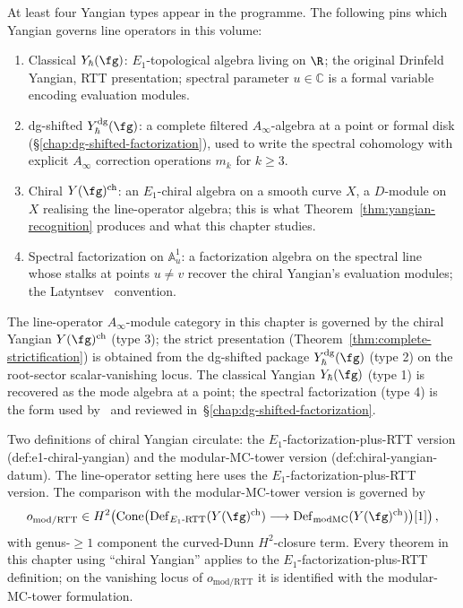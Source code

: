 \begin{convention}
\label{conv:line-operators-yangian-types}
At least four Yangian types appear in the programme. The following
pins which Yangian governs line operators in this volume:
\begin{enumerate}[label=\textup{(\arabic*)}]
\item Classical $Y_\hbar(\fg)$: $E_1$-topological algebra living on
$\R$; the original Drinfeld Yangian, RTT presentation; spectral
parameter $u\in \mathbb{C}$ is a formal variable encoding evaluation
modules.
\item dg-shifted $Y^{\mathrm{dg}}_\hbar(\fg)$: a complete filtered
$A_\infty$-algebra at a point or formal disk
(\S\ref{chap:dg-shifted-factorization}), used to write the
spectral cohomology with explicit $A_\infty$ correction
operations $m_k$ for $k\ge 3$.
\item Chiral $Y(\fg)^{\mathrm{ch}}$: an $E_1$-chiral algebra on a
smooth curve $X$, a $D$-module on $X$ realising the line-operator
algebra; this is what
Theorem~\ref{thm:yangian-recognition} produces and what this
chapter studies.
\item Spectral factorization on $\mathbb{A}^1_u$: a factorization
algebra on the spectral line whose stalks at points $u\ne v$
recover the chiral Yangian's evaluation modules; the
Latyntsev~\cite{Latyntsev23} convention.
\end{enumerate}
The line-operator $A_\infty$-module category in this chapter is
governed by the chiral Yangian $Y(\fg)^{\mathrm{ch}}$ (type 3); the
strict presentation
(Theorem~\ref{thm:complete-strictification}) is obtained from the
dg-shifted package $Y^{\mathrm{dg}}_\hbar(\fg)$ (type 2) on the
root-sector scalar-vanishing locus. The classical
Yangian $Y_\hbar(\fg)$ (type 1) is recovered as the
mode algebra at a point; the spectral factorization (type 4) is the
form used by~\cite{Latyntsev23} and reviewed
in~\S\ref{chap:dg-shifted-factorization}.
\end{convention}

\begin{remark}
\label{rem:line-operators-yangian-definitions}
Two definitions of chiral Yangian circulate: the
$E_1$-factorization-plus-RTT version (def:e1-chiral-yangian) and
the modular-MC-tower version (def:chiral-yangian-datum). The
line-operator setting here uses the $E_1$-factorization-plus-RTT
version. The comparison with the modular-MC-tower version is
governed by
\[
 o_{\mathrm{mod/RTT}}\in
 H^2\!\left(
 \operatorname{Cone}\bigl(
 \operatorname{Def}_{E_1\text{-}\mathrm{RTT}}(Y(\fg)^{\mathrm{ch}})
 \longrightarrow
 \operatorname{Def}_{\mathrm{modMC}}(Y(\fg)^{\mathrm{ch}})
 \bigr)[1]\right),
\]
with genus-$\ge1$ component the curved-Dunn $H^2$-closure term.
Every theorem in this chapter using ``chiral Yangian'' applies to
the $E_1$-factorization-plus-RTT definition; on the vanishing locus
of $o_{\mathrm{mod/RTT}}$ it is identified with the modular-MC-tower
formulation.
\end{remark}

